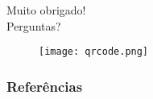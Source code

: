 
\begin{frame}[fragile]
  \begin{center}
    \LARGE Muito obrigado!\\
    \vspace{0.66cm}
    \Large Perguntas?
    \vspace{0.66cm}
    \begin{figure}
      \centering
      \texttt{[image: qrcode.png]}
    \end{figure}
  \end{center}
\end{frame}



\begin{frame}
  \frametitle{Referências}
  \nocite{*}
  \printbibliography
\end{frame}
